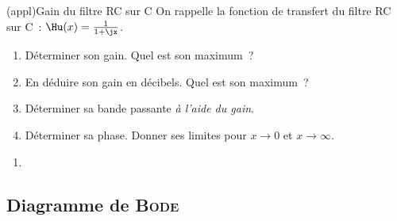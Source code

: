 \documentclass[../../main/main.tex]{subfiles}
\begin{document}
\begin{tcb*}[breakable](appl){Gain du filtre RC sur C}
	On rappelle la fonction de transfert du filtre RC sur C~: $\Hu(x) =
		\frac{1}{1+\jx}$.
	\begin{enumerate}
		\item Déterminer son gain. Quel est son maximum~?
		\item En déduire son gain en décibels. Quel est son maximum~?
		\item Déterminer sa bande passante \textit{à l'aide du gain}.
		\item Déterminer sa phase. Donner ses limites pour $x\to 0$ et $x\to\infty$.
	\end{enumerate}
	\tcblower
	\vspace{12pt}
	\begin{enumerate}
		\mitem
		\psw{
		\[
			\boxed{G(x) = \abs{\Hu} = \frac{1}{\sqrt{1+x^{2}}}}
			\qet
			\xul{G_{\max} = G(0) = 1}
		\]
		}
		\mitem
		\mitem
		\vspace*{-15pt}
		\item
	\end{enumerate}
\end{tcb*}

\subsection{Diagramme de \textsc{Bode}}
\end{document}
